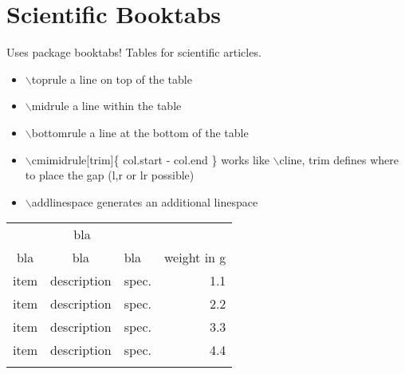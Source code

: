 \documentclass[a4paper,10pt]{scrartcl}
\begin{document}
\pagebreak
\section{Scientific Booktabs}
Uses package booktabs! Tables for scientific articles.
\begin{itemize}
 \item $\backslash$toprule a line on top of the table
 \item $\backslash$midrule a line within the table
 \item $\backslash$bottomrule a line at the bottom of the table
 \item $\backslash$cmimidrule[trim]\{ col.start - col.end \} works like $\backslash$cline, trim defines where to place the gap (l,r or lr possible)
 \item $\backslash$addlinespace generates an additional linespace
\end{itemize}

\begin{tabular}{cclr}
\toprule

\multicolumn{3}{c}{bla} \\

\cmidrule(r){1-3}\morecmidrules\cmidrule(r){1-3}

bla & bla & bla & weight in g \\

\midrule
item & description & spec. & 1.1 \\
item & description & spec. & 2.2 \\
item & description & spec. & 3.3 \\
item & description & spec. & 4.4 \\

\addlinespace

\bottomrule
\end{tabular}
\end{document}
